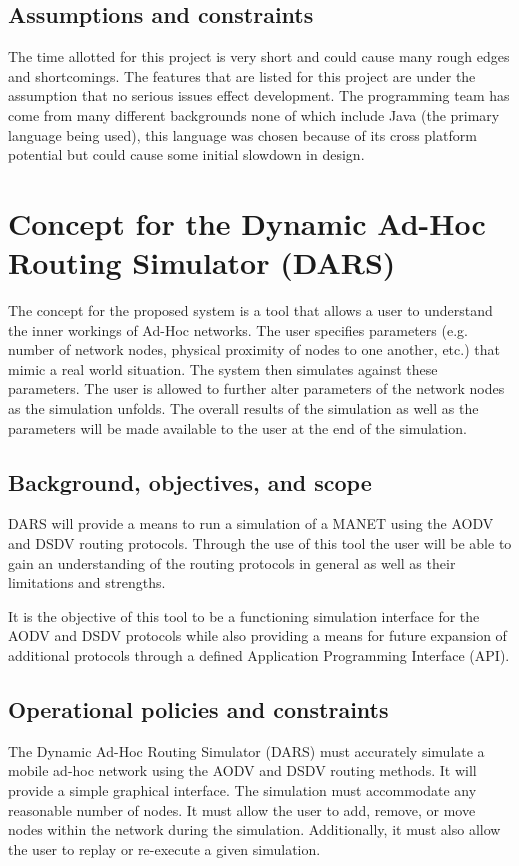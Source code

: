\documentclass[a4paper,11pt,titlepage]{article}
\begin{document}
\subsection{Assumptions and constraints}
The time allotted for this project is very short and could cause many rough edges and shortcomings.  The features that are listed for this project are under the assumption that no serious issues effect development. The programming team has come from many different backgrounds none of which include Java (the primary language being used), this language was chosen because of its cross platform potential but could cause some initial slowdown in design.
 
\section{ Concept for the Dynamic Ad-Hoc Routing Simulator (DARS)}
The concept for the proposed system is a tool that allows a user to understand the inner workings of Ad-Hoc networks. The user specifies parameters (e.g. number of network nodes, physical proximity of nodes to one another, etc.) that mimic a real world situation. The system then simulates against these parameters. The user is allowed to further alter parameters of the network nodes as the simulation unfolds. The overall results of the simulation as well as the parameters will be made available to the user at the end of the simulation.
 
\subsection{Background, objectives, and scope}
DARS will provide a means to run a simulation of a MANET using the AODV and DSDV routing protocols.  Through the use of this tool the user will be able to gain an understanding of the routing protocols in general as well as their limitations and strengths.  
 
It is the objective of this tool to be a functioning simulation interface for the AODV and DSDV protocols while also providing a means for future expansion of additional protocols through a defined Application Programming Interface (API).
 
\subsection{Operational policies and constraints}
The Dynamic Ad-Hoc Routing Simulator (DARS) must accurately simulate a mobile ad-hoc network using the AODV and DSDV routing methods. It will provide a simple graphical interface. The simulation must accommodate any reasonable number of nodes.  It must allow the user to add, remove, or move nodes within the network during the simulation. Additionally, it must also allow the user to replay or re-execute a given simulation. 
 
\end{document}
